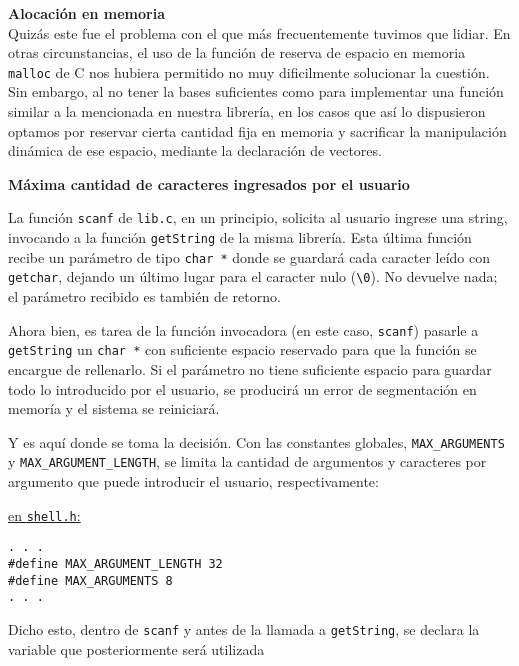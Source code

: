 \documentclass[12pt, a4paper, spanish]{report}
\begin{document}
\textbf{\large{Alocaci\'on en memoria}}\\
\indent Quiz\'as este fue el problema con el que m\'as frecuentemente tuvimos que lidiar. En otras circunstancias, el uso de la
funci\'on de reserva de espacio en memoria \texttt{malloc} de C nos hubiera permitido no muy dificilmente solucionar la cuesti\'on.
Sin embargo, al no tener la bases suficientes como para implementar una funci\'on similar a la mencionada en nuestra librer\'ia,
en los casos que as\'i lo dispusieron optamos por reservar cierta cantidad fija en memoria y sacrificar la
manipulaci\'on din\'amica de ese espacio, mediante la declaraci\'on de vectores.\par \noindent \newline
\indent \textbf{M\'axima cantidad de caracteres ingresados por el usuario}\par
La funci\'on \texttt{scanf} de \texttt{lib.c}, en un principio, solicita al usuario ingrese una string, invocando a la funci\'on
\texttt{getString} de la misma librer\'ia. Esta \'ultima funci\'on recibe un par\'ametro de tipo \texttt{char *} donde se guardar\'a
cada caracter le\'ido con \texttt{getchar}, dejando un \'ultimo lugar para el caracter nulo (\texttt{\textquotesingle \textbackslash0\textquotesingle}). No devuelve nada; el par\'ametro
recibido es tambi\'en de retorno.\par \noindent \newline
\indent Ahora bien, es tarea de la funci\'on invocadora (en este caso, \texttt{scanf}) pasarle a \texttt{getString} un \texttt{char *} con suficiente
espacio reservado para que la funci\'on se encargue de rellenarlo. Si el par\'ametro no tiene suficiente espacio para guardar
todo lo introducido por el usuario, se producir\'a un error de segmentaci\'on en memor\'ia y el sistema se reiniciar\'a.
\par \noindent \newline
\indent Y es aqu\'i donde se toma la decisi\'on. Con las constantes globales, \texttt{MAX\_ARGUMENTS} y \texttt{MAX\_ARGUMENT\_LENGTH}, 
se limita la cantidad de argumentos y caracteres por argumento que puede introducir el usuario, respectivamente:\par \noindent
\newline \newline \underline{en \texttt{shell.h}:}
\begin{lstlisting}[style=C]
. . .
#define MAX_ARGUMENT_LENGTH 32
#define MAX_ARGUMENTS 8
. . .
\end{lstlisting}
\par Dicho esto, dentro de \texttt{scanf} y antes de la llamada a \texttt{getString}, se declara la variable que posteriormente ser\'a utilizada
\end{document}
